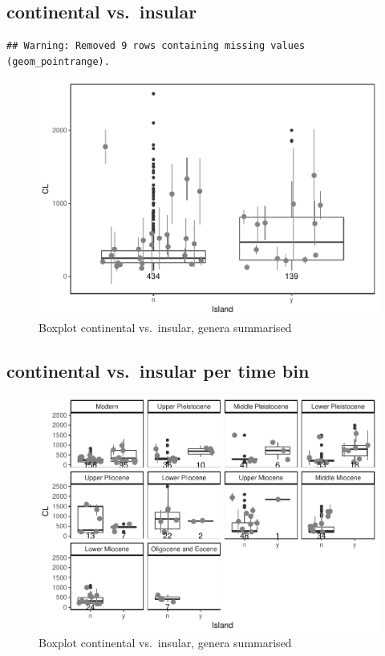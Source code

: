 \documentclass[]{article}
\begin{document}
\newpage

\subsection{continental vs.~insular}\label{continental-vs.insular-1}

\begin{verbatim}
## Warning: Removed 9 rows containing missing values (geom_pointrange).
\end{verbatim}

\begin{figure}[htbp]
\centering
\includegraphics{MA_JJ_files/figure-latex/Boxplot continental vs. insular-1.pdf}
\caption{Boxplot continental vs.~insular, genera summarised}
\end{figure}

\newpage

\subsection{continental vs.~insular per time
bin}\label{continental-vs.insular-per-time-bin-1}

\begin{figure}[htbp]
\centering
\includegraphics{MA_JJ_files/figure-latex/Boxplot continental vs. insular, split into time bins-1.pdf}
\caption{Boxplot continental vs.~insular, genera summarised}
\end{figure}
\end{document}

